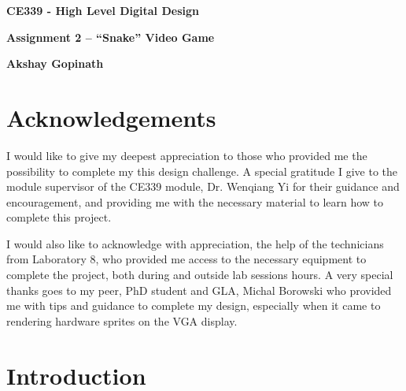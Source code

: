 \documentclass[aps, secnumarabic, balancelastpage, asmath, amssymb, nofootinbib, floatfix,]{revtex4-2}
\begin{document}
\thispagestyle{plain}
\begin{center}
    \Large
    \textbf{CE339 - High Level Digital Design}
        
    \vspace{0.4cm}
    \large
    \textbf{Assignment 2 -- ``Snake'' Video Game}
        
    \vspace{0.4cm}
    \textbf{Akshay Gopinath}
       
    \section*{Acknowledgements}
    \fontsize{11pt}{12pt}\selectfont
    
\end{center}
\fontsize{11pt}{12pt}\selectfont
{
\setlength{\parindent}{0pt}

I would like to give my deepest appreciation to those who provided me the possibility to complete my this
design challenge. A special gratitude I give to the module supervisor of the CE339 module, Dr. Wenqiang Yi for their guidance and encouragement, and providing me with the necessary material to learn how to complete this project.

I would also like to acknowledge with appreciation, the help of the technicians from Laboratory 8, who provided
me access to the necessary equipment to complete the project, both during and outside lab sessions hours. A very
special thanks goes to my peer, PhD student and GLA, Michal Borowski who provided me with tips and guidance to complete my design, especially when it came to rendering hardware sprites on the VGA display.

}

\clearpage

\tableofcontents

\clearpage

\listoffigures
\clearpage


\clearpage


\section{\fontsize{11.3pt}{12pt}\selectfont \bf Introduction}
\fontsize{11pt}{12pt}\selectfont
\label{sec:1}
\end{document}
